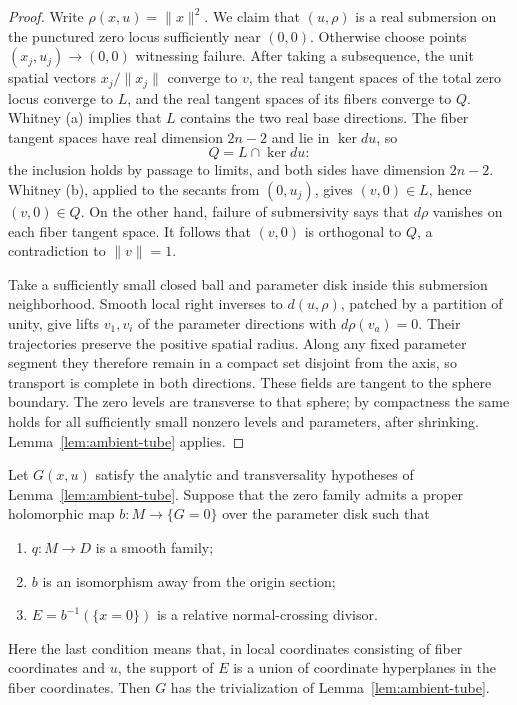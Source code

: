 \begin{proof}
Write $\rho(x,u)=\|x\|^2$. We claim that $(u,\rho)$ is a real
submersion on the punctured zero locus sufficiently near $(0,0)$.
Otherwise choose points $(x_j,u_j)\to(0,0)$ witnessing failure.
After taking a subsequence, the unit spatial vectors $x_j/\|x_j\|$
converge to $v$, the real tangent spaces of the total zero locus converge
to $L$, and the real tangent spaces of its fibers converge to $Q$.
Whitney \textup{(a)} implies that $L$ contains the two real base
directions. The fiber tangent spaces have real dimension $2n-2$ and lie
in $\ker du$, so
\[
 Q=L\cap\ker du:
\]
the inclusion holds by passage to limits, and both sides have dimension
$2n-2$. Whitney \textup{(b)}, applied to the secants from $(0,u_j)$,
gives $(v,0)\in L$, hence $(v,0)\in Q$. On the other hand, failure of
submersivity says that $d\rho$ vanishes on each fiber tangent space.
It follows that $(v,0)$ is orthogonal to $Q$, a contradiction to
$\|v\|=1$.

Take a sufficiently small closed ball and parameter disk inside this
submersion neighborhood. Smooth local right inverses to $d(u,\rho)$,
patched by a partition of unity, give lifts $v_1,v_i$ of the parameter
directions with $d\rho(v_a)=0$. Their trajectories preserve the positive
spatial radius. Along any fixed parameter segment they therefore remain
in a compact set disjoint from the axis, so transport is complete in both
directions. These fields are tangent to the sphere boundary. The zero
levels are transverse to that sphere; by compactness the same holds for
all sufficiently small nonzero levels and parameters, after shrinking.
Lemma~\ref{lem:ambient-tube} applies.
\end{proof}

\begin{proposition}
\label{prop:resolution-right}
Let $G(x,u)$ satisfy the analytic and transversality hypotheses of
Lemma~\ref{lem:ambient-tube}. Suppose that the zero family admits a
proper holomorphic map $b:M\to\{G=0\}$ over the parameter disk such that
\begin{enumerate}
\item $q:M\to D$ is a smooth family;
\item $b$ is an isomorphism away from the origin section;
\item $E=b^{-1}(\{x=0\})$ is a relative normal-crossing divisor.
\end{enumerate}
Here the last condition means that, in local coordinates consisting of
fiber coordinates and $u$, the support of $E$ is a union of coordinate
hyperplanes in the fiber coordinates. Then $G$ has the trivialization
of Lemma~\ref{lem:ambient-tube}.
\end{proposition}

